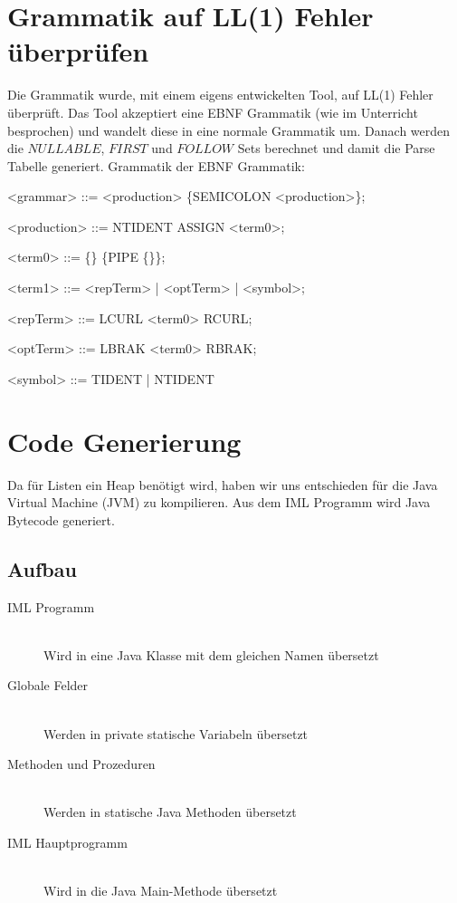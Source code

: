 \documentclass[a4paper,notitlepage,oneside]{article}
\begin{document}
\section{Grammatik auf LL(1) Fehler überprüfen}
Die Grammatik wurde, mit einem eigens entwickelten Tool, auf LL(1) Fehler überprüft. Das Tool akzeptiert eine EBNF Grammatik (wie im Unterricht besprochen) und wandelt diese in eine normale Grammatik um. Danach werden die $NULLABLE$, $FIRST$ und $FOLLOW$ Sets berechnet und damit die Parse Tabelle generiert.
\newline
\newline
Grammatik der EBNF Grammatik:
\begin{grammar}
<grammar> ::= <production> \{SEMICOLON <production>\};

<production> ::= NTIDENT ASSIGN <term0>;

<term0> ::= \{<term1>\} \{PIPE \{<term1>\}\};

<term1> ::= <repTerm> | <optTerm> | <symbol>;

<repTerm> ::= LCURL <term0> RCURL;

<optTerm> ::= LBRAK <term0> RBRAK;

<symbol> ::= TIDENT | NTIDENT
\end{grammar}

\section{Code Generierung}
Da für Listen ein Heap benötigt wird, haben wir uns entschieden für die Java Virtual Machine (JVM) zu kompilieren. Aus dem IML Programm wird Java Bytecode generiert.

\subsection{Aufbau}
\begin{description}
	\item[IML Programm] \hfill \\
	Wird in eine Java Klasse mit dem gleichen Namen 		übersetzt
	\item[Globale Felder] \hfill \\
	Werden in private statische Variabeln übersetzt
	\item[Methoden und Prozeduren] \hfill \\
	Werden in statische Java Methoden übersetzt
	\item[IML Hauptprogramm] \hfill \\
	Wird in die Java Main-Methode übersetzt
\end{description}
\end{document}
